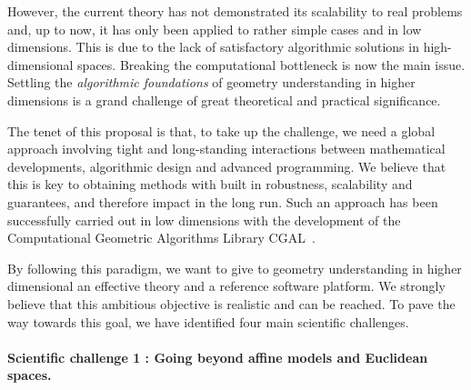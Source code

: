 

However, the current theory has not demonstrated its scalability to real problems and, up to now, it has only been applied to rather simple cases and in low dimensions. This is  due to the lack of satisfactory algorithmic solutions in high-dimensional spaces.
Breaking the computational bottleneck is now the main issue.  Settling the {\em algorithmic foundations} of geometry understanding in
higher dimensions
is a grand challenge of great theoretical and practical significance. 


The tenet of this proposal is that, to take up the challenge, we need a global approach involving
tight and long-standing interactions between mathematical developments, algorithmic design and advanced programming. We believe that this is key to obtaining methods with built in
robustness, scalability and guarantees, and therefore  impact in the long run.
Such an approach has been successfully carried out in low dimensions with the 
development of the Computational Geometric Algorithms Library CGAL~\cite{cgal}. 

By following this paradigm, we want  to give to  geometry understanding in higher dimensional an effective theory and a reference software platform. 
We strongly believe that this ambitious objective is realistic and can be reached. To pave the way towards this goal, we have identified  four main scientific challenges.



\paragraph{Scientific challenge 1 :  Going beyond affine models and Euclidean spaces.}

